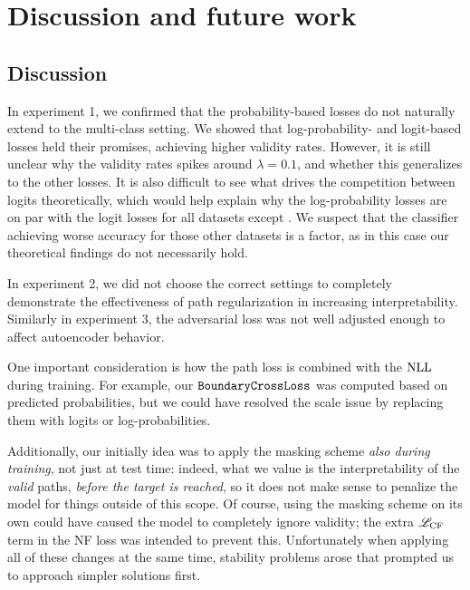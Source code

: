\documentclass[../main.tex]{subfiles}
\begin{document}
\chapter{Discussion and future work}
\label{ch:discussion}

\section{Discussion}

In experiment 1, we confirmed that the probability-based losses do not naturally extend to the multi-class setting.
We showed that log-probability- and logit-based losses held their promises, achieving higher validity rates.
However, it is still unclear why the validity rates spikes around $\lambda = 0.1$, and whether this generalizes
to the other losses.
It is also difficult to see what drives the competition between logits theoretically,
which would help explain why the log-probability losses are on par with the logit losses for all datasets except \CakeOnSea.
We suspect that the classifier achieving worse accuracy for those other datasets is a factor,
as in this case our theoretical findings do not necessarily hold.

In experiment 2, we did not choose the correct settings to completely demonstrate the effectiveness of path regularization
in increasing interpretability.
Similarly in experiment 3, the adversarial loss was not well adjusted enough to affect autoencoder behavior.

One important consideration is how the path loss is combined with the $\text{NLL}$ during training.
For example, our $\mathtt{BoundaryCrossLoss}$ was computed based on predicted probabilities, but we could have
resolved the scale issue by replacing them with logits or log-probabilities.

Additionally, our initially idea was to apply the masking scheme \emph{also during training}, not just at test time:
indeed, what we value is the interpretability of the \emph{valid} paths, \emph{before the target is reached}, so it does not make
sense to penalize the model for things outside of this scope.
Of course, using the masking scheme on its own could have caused the model to completely ignore validity; the extra
$\mathscr{L}_\text{CF}$ term in the NF loss was intended to prevent this.
Unfortunately when applying all of these changes at the same time, stability problems arose that prompted us to
approach simpler solutions first.
\end{document}
